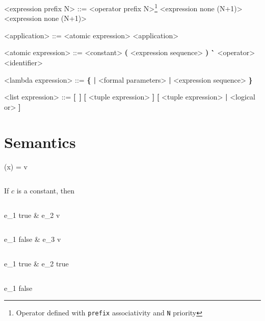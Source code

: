\documentclass[12pt]{article}
\begin{document}
\begin{grammar}
<expression prefix N> ::= <operator prefix N>\footnote{Operator defined with \texttt{prefix} associativity and \texttt{N} priority} <expression none (N+1)>
    \alt <expression none (N+1)>

<application> ::= <atomic expression> <application>

<atomic expression> ::= <constant>
    \alt \textbf{(} <expression sequence> \textbf{)}
    \alt \textbf{\`} <operator>
    \alt <identifier>

<lambda expression> ::= \textbf{\{ |} <formal parameters> \textbf{|} <expression sequence> \textbf{\}}

<list expression> ::= \textbf{[} \,\textbf{]}
    \alt \textbf{[} <tuple expression> \textbf{]}
    \alt \textbf{[} <tuple expression> \textbf{|} <logical or> \textbf{]}

\end{grammar}

\section{Semantics}

      {\rho(x) = v}

$ $\newline 

If $c$ is a constant, then\,\,
      {}

$ $\newline

      {\rho \vdash e_1 \Downarrow true
      & \rho \vdash e_2 \Downarrow v}

$ $\newline 

      {\rho \vdash e_1 \Downarrow false
      & \rho \vdash e_3 \Downarrow v}


$ $\newline 

    {\rho \vdash e_1 \Downarrow true
    & \rho \vdash e_2 \Downarrow true}


$ $\newline 

      {\rho \vdash e_1 \Downarrow false}
\end{document}
